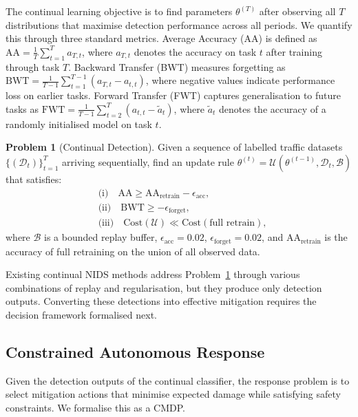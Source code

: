 \documentclass[journal]{IEEEtran}
\theoremstyle{definition}
\newtheorem{problem}{Problem}
\theoremstyle{remark}
\begin{document}
The continual learning objective is to find parameters $\theta^{(T)}$ after observing all $T$ distributions that maximise detection performance across all periods. We quantify this through three standard metrics. Average Accuracy (AA) is defined as $\mathrm{AA} = \frac{1}{T}\sum_{t=1}^{T} a_{T,t}$, where $a_{T,t}$ denotes the accuracy on task $t$ after training through task $T$. Backward Transfer (BWT) measures forgetting as $\mathrm{BWT} = \frac{1}{T-1}\sum_{t=1}^{T-1}(a_{T,t} - a_{t,t})$, where negative values indicate performance loss on earlier tasks. Forward Transfer (FWT) captures generalisation to future tasks as $\mathrm{FWT} = \frac{1}{T-1}\sum_{t=2}^{T}(a_{t,t} - \tilde{a}_t)$, where $\tilde{a}_t$ denotes the accuracy of a randomly initialised model on task $t$.

\begin{problem}[Continual Detection]
\label{prob:cl}
Given a sequence of labelled traffic datasets $\{(\mathcal{D}_t)\}_{t=1}^{T}$ arriving sequentially, find an update rule $\theta^{(t)} = \mathcal{U}(\theta^{(t-1)}, \mathcal{D}_t, \mathcal{B})$ that satisfies:
\begin{align}
&\text{(i)} \quad \mathrm{AA} \geq \mathrm{AA}_{\mathrm{retrain}} - \epsilon_{\mathrm{acc}}, \label{eq:cl_obj1}\\
&\text{(ii)} \quad \mathrm{BWT} \geq -\epsilon_{\mathrm{forget}}, \label{eq:cl_obj2}\\
&\text{(iii)} \quad \mathrm{Cost}(\mathcal{U}) \ll \mathrm{Cost}(\text{full retrain}), \label{eq:cl_obj3}
\end{align}
where $\mathcal{B}$ is a bounded replay buffer, $\epsilon_{\mathrm{acc}} = 0.02$, $\epsilon_{\mathrm{forget}} = 0.02$, and $\mathrm{AA}_{\mathrm{retrain}}$ is the accuracy of full retraining on the union of all observed data.
\end{problem}

Existing continual NIDS methods address Problem~\ref{prob:cl} through various combinations of replay and regularisation, but they produce only detection outputs. Converting these detections into effective mitigation requires the decision framework formalised next.

\subsection{Constrained Autonomous Response}
\label{subsec:prob_rl}

Given the detection outputs of the continual classifier, the response problem is to select mitigation actions that minimise expected damage while satisfying safety constraints. We formalise this as a CMDP.
\end{document}

